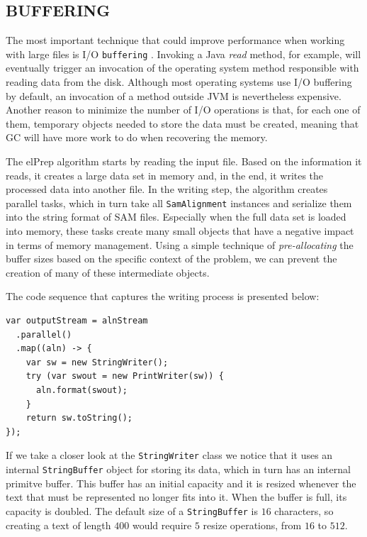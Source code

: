 \documentclass[a4paper,twoside]{article}
\begin{document}
\subsection{\uppercase{Buffering}}
\label{io:buffering}

The most important technique that could improve performance when working with large files
is I/O {\tt buffering} \cite{oaks:2014}. Invoking a Java {\it read} method, for example, will eventually trigger an invocation of the operating system method responsible with reading data from the disk.
Although most operating systems use I/O buffering by default, an invocation of a method outside JVM is nevertheless expensive. Another reason to minimize the number of I/O operations is that, for each one of them, temporary objects needed to store the data must be created, meaning that GC will have more work to do when recovering the memory. 


The elPrep algorithm starts by reading the input file. Based on the information it reads, it creates a large data set in memory and, in the end, it writes the processed data into another file.
In the writing step, the algorithm creates parallel tasks, which in turn take all \texttt{SamAlignment} instances and serialize them into the string format of SAM files. 
Especially when the full data set is loaded into memory, these tasks create many small objects that have a negative impact in terms of memory management. Using a simple technique of {\it pre-allocating} the buffer sizes based on the specific context of the problem, we can prevent the creation of many of these intermediate objects.

The code sequence that captures the writing process is presented below:
\begin{verbatim}
var outputStream = alnStream
  .parallel()
  .map((aln) -> {
    var sw = new StringWriter();
    try (var swout = new PrintWriter(sw)) {
      aln.format(swout);
    }
    return sw.toString();
});
\end{verbatim}

If we take a closer look at the {\texttt{StringWriter}} class we notice that it uses an internal {\texttt{StringBuffer}} object for storing its data, which in turn has an internal primitve buffer.
This buffer has an initial capacity and it is resized whenever the text that must be represented no longer fits into it. When the buffer is full, its capacity is doubled. 
The default size of a \texttt{StringBuffer} is $16$ characters, so creating a text of length $400$ would require $5$ resize operations, from $16$ to $512$. 
\end{document}
